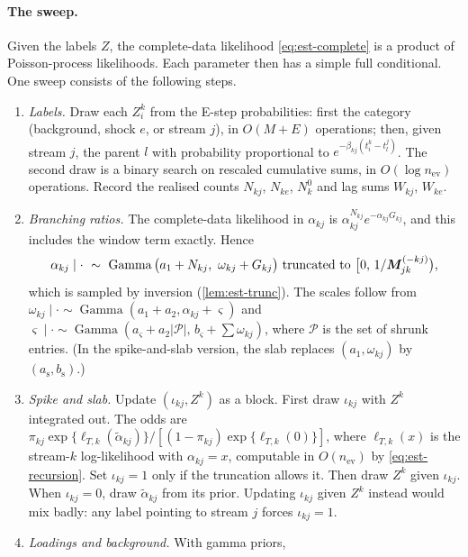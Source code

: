 \paragraph{The sweep.} Given the labels $Z$, the
complete-data likelihood \eqref{eq:est-complete} is a product of Poisson-process
likelihoods. Each parameter then has a simple full conditional. One sweep consists of the
following steps.
\begin{enumerate}[(1)]
  \item \emph{Labels.} Draw each $Z^k_i$ from the E-step probabilities: first the category
    (background, shock $e$, or stream $j$), in $O(M+E)$ operations; then, given stream
    $j$, the parent $l$ with probability proportional to $e^{-\beta_{kj}(t^k_i-t^j_l)}$.
    The second draw is a binary search on rescaled cumulative sums, in $O(\log n_{\mathrm{ev}})$
    operations. Record the realised counts $N_{kj}$, $N_{ke}$, $N^0_k$ and lag sums
    $W_{kj}$, $W_{ke}$.
  \item \emph{Branching ratios.} The complete-data likelihood in $\alpha_{kj}$ is
    $\alpha_{kj}^{N_{kj}}e^{-\alpha_{kj}G_{kj}}$, and this includes the window term
    exactly. Hence
    \[
      \alpha_{kj}\mid\cdot\ \sim\ \operatorname{Gamma}\big(a_1+N_{kj},\ \omega_{kj}+G_{kj}\big)
      \ \text{truncated to}\ \big[0,\,1/\Mmat^{(-kj)}_{jk}\big),
    \]
    which is sampled by inversion (\cref{lem:est-trunc}). The scales follow from
    $\omega_{kj}\mid\cdot\sim\operatorname{Gamma}(a_1+a_2,\alpha_{kj}+\varsigma)$ and
    $\varsigma\mid\cdot\sim\operatorname{Gamma}(a_\varsigma+a_2|\mathcal P|,\,b_\varsigma+\sum\omega_{kj})$,
    where $\mathcal P$ is the set of shrunk entries. (In the spike-and-slab version, the
    slab replaces $(a_1,\omega_{kj})$ by $(a_{\mathrm s},b_{\mathrm s})$.)
  \item \emph{Spike and slab.} Update $(\iota_{kj},Z^k)$ as a block. First draw
    $\iota_{kj}$ with $Z^k$ integrated out. The odds are
    $\pi_{kj}\exp\{\ell_{T,k}(\tilde\alpha_{kj})\}/[(1-\pi_{kj})\exp\{\ell_{T,k}(0)\}]$, where
    $\ell_{T,k}(x)$ is the stream-$k$ log-likelihood with $\alpha_{kj}=x$, computable in
    $O(n_{\mathrm{ev}})$ by \eqref{eq:est-recursion}.
    Set $\iota_{kj}=1$ only if the truncation allows it. Then draw $Z^k$ given
    $\iota_{kj}$. When $\iota_{kj}=0$, draw $\tilde\alpha_{kj}$ from its prior. Updating $\iota_{kj}$ given $Z^k$ instead would mix badly: any label
    pointing to stream $j$ forces $\iota_{kj}=1$.
  \item \emph{Loadings and background.} With gamma priors,

\end{enumerate}
